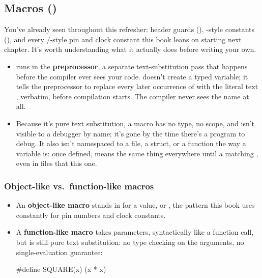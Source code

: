 \subsection{Macros ()}
\label{c1:a:12}
You've already seen  throughout this refresher: header guards (),
-style constants (), and every /-style
pin and clock constant this book leans on starting next chapter. It's worth understanding what it
actually does before writing your own.
\begin{itemize}
  \item {} runs in the \textbf{preprocessor}, a separate text-substitution pass that
    happens before the compiler ever sees your code.  doesn't create a
    typed variable; it tells the preprocessor to replace every later occurrence of
     with the literal text , verbatim, before compilation starts. The
    compiler never sees the name  at all.
  \item Because it's pure text substitution, a macro has no type, no scope, and isn't visible to a
    debugger by name; it's gone by the time there's a program to debug. It also isn't namespaced to
    a file, a struct, or a function the way a variable is: once defined,  means
    the same thing everywhere until a matching , even in files that 
    this one.
\end{itemize}

\subsubsection{Object-like vs.\ function-like macros}
\begin{itemize}
  \item An \textbf{object-like macro} stands in for a value,  or
    , the pattern this book uses constantly for pin numbers and clock
    constants.
  \item A \textbf{function-like macro} takes parameters, syntactically like a function call, but is
    still pure text substitution: no type checking on the arguments, no single-evaluation
    guarantee:
\begin{ccode}
#define SQUARE(x) (x * x)
\end{ccode}
\end{itemize}

